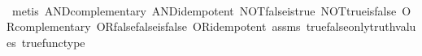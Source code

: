 \begin{isabellebody}
%
\isadelimproof
\ \ %
\endisadelimproof
%
\isatagproof
{}\isamarkupfalse%
\ {\isacharparenleft}{\kern0pt}metis\ AND{\isacharunderscore}{\kern0pt}complementary\ AND{\isacharunderscore}{\kern0pt}idempotent\ NOT{\isacharunderscore}{\kern0pt}false{\isacharunderscore}{\kern0pt}is{\isacharunderscore}{\kern0pt}true\ NOT{\isacharunderscore}{\kern0pt}true{\isacharunderscore}{\kern0pt}is{\isacharunderscore}{\kern0pt}false\ OR{\isacharunderscore}{\kern0pt}complementary\ OR{\isacharunderscore}{\kern0pt}false{\isacharunderscore}{\kern0pt}false{\isacharunderscore}{\kern0pt}is{\isacharunderscore}{\kern0pt}false\ OR{\isacharunderscore}{\kern0pt}idempotent\ assms\ true{\isacharunderscore}{\kern0pt}false{\isacharunderscore}{\kern0pt}only{\isacharunderscore}{\kern0pt}truth{\isacharunderscore}{\kern0pt}values\ true{\isacharunderscore}{\kern0pt}func{\isacharunderscore}{\kern0pt}type{\isacharparenright}{\kern0pt}%
\endisatagproof
{\isafoldproof}%
%
\isadelimproof
\isanewline
%
\endisadelimproof
\ \isanewline
\isanewline
%
\isadelimtheory
\isanewline
%
\endisadelimtheory
%
\isatagtheory
{}\isamarkupfalse%
%
\endisatagtheory
{\isafoldtheory}%
%
\isadelimtheory
%
\endisadelimtheory
%
\end{isabellebody}%
\endinput
